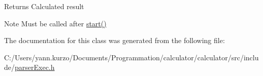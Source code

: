 \begin{DoxyReturn}{Returns}
Calculated result 
\end{DoxyReturn}
\begin{DoxyNote}{Note}
Must be called after \hyperlink{class_parser_exec_aa00f3c5f1f4ea46e1c6aafebff8d4e9f}{start()} 
\end{DoxyNote}


The documentation for this class was generated from the following file\+:\begin{DoxyCompactItemize}
\item 
C\+:/\+Users/yann.\+kurzo/\+Documents/\+Programmation/calculator/calculator/src/include/\hyperlink{parser_exec_8h}{parser\+Exec.\+h}\end{DoxyCompactItemize}
